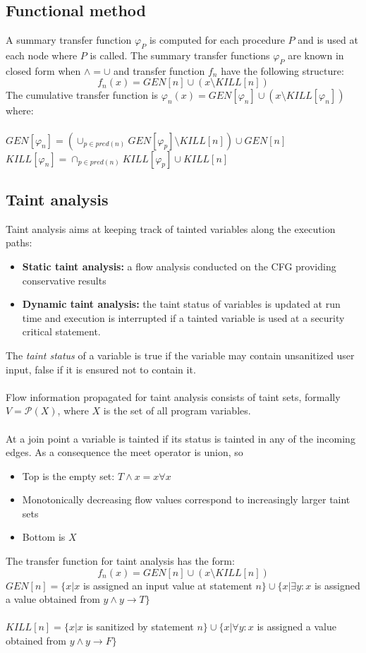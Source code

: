 \documentclass[10pt,a4paper]{article}
\begin{document}
\subsection{Functional method}
A summary transfer function $\varphi_P$ is computed for each procedure $P$ and is used at each node where $P$ is called. The summary transfer functions $\varphi_P$ are known in closed form when $\wedge = \cup$ and transfer function $f_n$ have the following structure:
$$ f_n(x) = GEN[n] \cup (x \setminus KILL[n])$$
The cumulative transfer function is $\varphi_n(x) = GEN[\varphi_n] \cup (x \setminus KILL[\varphi_n])$ where:\\\\
$ GEN[\varphi_n] = (\cup_{p\in pred(n)}GEN[\varphi_p] \setminus KILL[n]) \cup GEN[n]$\\
$ KILL[\varphi_n] = \cap_{p\in pred(n)}KILL[\varphi_p]\cup KILL[n]$
\newpage
\subsection{Taint analysis}
Taint analysis aims at keeping track of tainted variables along the execution paths:
\begin{itemize}
\item {\bf Static taint analysis:} a flow analysis conducted on the CFG providing conservative results
\item {\bf Dynamic taint analysis:} the taint status of variables is updated at run time and execution is interrupted if a tainted variable is used at a security critical statement.
\end{itemize}
The \emph{taint status} of a variable is true if the variable may contain unsanitized user input, false if it is ensured not to contain it.\\\\
Flow  information propagated for taint analysis consists of taint sets, formally $V = \mathcal{P}(X)$, where $X$ is the set of all program variables.\\\\
At a join point a variable is tainted if its status is tainted in any of the incoming edges. As a consequence the meet operator is union, so
\begin{itemize}
\item Top is the empty set: $T \wedge x = x \forall x$
\item Monotonically decreasing flow values correspond to increasingly larger taint sets
\item Bottom is $X$
\end{itemize}
The transfer function for taint analysis has the form:
$$ f_n(x) = GEN[n] \cup (x \setminus KILL[n])$$
$GEN[n] = \{ x | x $ is assigned an input value at statement $n \} \cup \{ x | \exists y: x$ is assigned a value obtained from $y \wedge y \to T\}$\\\\
$KILL[n] = \{x|x$ is sanitized by statement $n \} \cup \{ x| \forall y: x $ is assigned a value obtained from $y \wedge y \to F \}$\\\\
\end{document}
